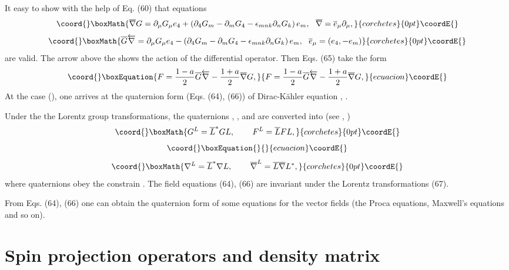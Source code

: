 \documentclass[a4paper,12pt]{article}
\begin{document}
It easy to show with the help of Eq. (60) that equations
\[\coord{}\boxMath{
\overline{\nabla }G=\partial_\mu G_\mu e_4+\left(\partial_4 G_m
-\partial_m G_4 -\epsilon_{mnk}\partial_n G_k \right)e_m
,~~\overline{\nabla }=\overline{e}_\mu \partial _\mu ,
}{corchetes}{0pt}\coordE{}\]
\[\coord{}\boxMath{
\overline{G}\overleftarrow{\nabla}=\partial_\mu G_\mu
e_4-\left(\partial_4 G_m -\partial_m G_4 -\epsilon_{mnk}\partial_n
G_k \right)e_m ,~~\overline{e} _\mu =(e_4,-e_m)
}{corchetes}{0pt}\coordE{}\]
are valid. The arrow above the \myHighlight{$\nabla$}\coordHE{} shows the action of the
differential operator. Then Eqs. (65) take the form
\begin{equation}\coord{}\boxEquation{
F=\frac{1-a}{2}\overline{G}\overleftarrow{\nabla}-\frac{1+a}{2}\overline{\nabla
}G  , \label{66}
}{
F=\frac{1-a}{2}\overline{G}\overleftarrow{\nabla}-\frac{1+a}{2}\overline{\nabla
}G  , }{ecuacion}\coordE{}\end{equation}
At the case \coordHE{} (\coordHE{}), one arrives at the quaternion form
(Eqs. (64), (66)) of Dirac-K\"{a}hler equation \cite{Kruglov1},
\cite{monogr}.

Under the the Lorentz group transformations, the quaternions \coordHE{},
\coordHE{}, \myHighlight{$ \nabla $}\coordHE{} and \myHighlight{$\overline{\nabla }$}\coordHE{} are converted into (see
\cite{Kruglov1}, \cite{monogr})
\[\coord{}\boxMath{
G^L=\overline{L}^{*}GL,\hspace{0.3in}F^L=\overline{L}FL,
}{corchetes}{0pt}\coordE{}\]
\vspace{-8mm}
\begin{equation}\coord{}\boxEquation{
\label{67}
}{
}{ecuacion}\coordE{}\end{equation}
\vspace{-8mm}
\[\coord{}\boxMath{
\nabla ^L=\overline{L}^{*}\nabla L,\hspace{0.3in}\overline{\nabla
}^L= \overline{L}\overline{\nabla }L^{*} ,
}{corchetes}{0pt}\coordE{}\]
where quaternions \coordHE{} obey the constrain
\coordHE{}. The field equations (64), (66)
are invariant under the Lorentz transformations (67).

From Eqs. (64), (66) one can obtain the quaternion form of some
equations for the vector fields (the Proca equations, Maxwell's
equations and so on).

\section{Spin projection operators and density matrix}
\end{document}
